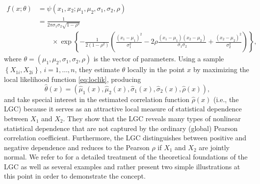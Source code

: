 \begin{align}
f\left(x;\theta\right) 
&= \psi\left(x_1, x_2;\mu_1, \mu_2, \sigma_1, \sigma_2, \rho\right)  \nonumber\\ 
&= \frac{1}{2\pi \sigma_1 \sigma_2\sqrt{1-\rho^2}} \nonumber \\
& \qquad \times\exp \left\{-\frac{1}{2(1-\rho^2)}\left(\frac{\left(x_1-\mu_1\right)^2}{\sigma_1^2}-2\rho\frac{\left(x_1-\mu_1\right)\left(x_2-\mu_2\right)}{\sigma_1 \sigma_2}+\frac{\left(x_2-\mu_2\right)^2}{\sigma_2^2}\right)\right\},
\label{eq:gaussian}
\end{align}
where $\theta = \left(\mu_1,\mu_2,\sigma_1,\sigma_2,\rho\right)$ is the vector of parameters. Using a sample $\left\{X_{1i}, X_{2i}\right\}$, $i = 1, \ldots, n$, they estimate $\theta$ locally in the point $x$ by maximizing the local likelihood function \eqref{eq:loclik}, producing
$$\widehat\theta\left(x\right) = \left(\widehat\mu_1\left(x\right), \widehat\mu_2\left(x\right), \widehat\sigma_1\left(x\right), \widehat\sigma_2\left(x\right), \widehat\rho\left(x\right)\right),$$
and take special interest in the estimated correlation function $\widehat\rho\left(x\right)$ (i.e., the LGC) because it serves as an attractive local measure of statistical dependence between $X_1$ and $X_2$. They show that the LGC reveals many types of nonlinear statistical dependence that are not captured by the ordinary (global) Pearson correlation coefficient. Furthermore, the LGC distinguishes between positive and negative dependence and reduces to the Pearson $\rho$ if $X_1$ and $X_2$ are jointly normal. We refer to \cite{tjos:huft:2013} for a detailed treatment of the theoretical foundations of the LGC as well as several examples and rather present two simple illustrations at this point in order to demonstrate the concept. 

